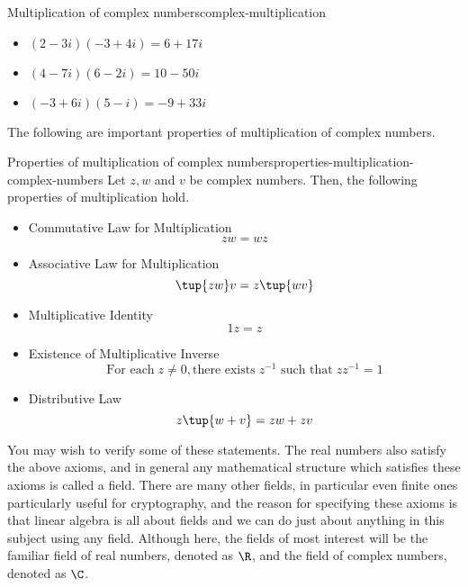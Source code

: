 \begin{example}{Multiplication of complex numbers}{complex-multiplication}
\begin{itemize}
\item $(2-3i)(-3+4i) = 6+17i$
\item $(4-7i)(6-2i) = 10-50i$
\item $(-3+6i)(5-i) = -9+33i$
\end{itemize}
\end{example}

The following are important properties of multiplication of complex numbers.

\begin{theorem}{Properties of multiplication of complex numbers}{properties-multiplication-complex-numbers}
Let $z,w$ and $v$ be complex numbers. Then, the following properties of multiplication hold.

\begin{itemize}

\item Commutative Law for Multiplication
\begin{equation*}
zw=wz
\end{equation*}

\item Associative Law for Multiplication
\begin{equation*}
\tup{zw} v=z\tup{wv} 
\end{equation*}

\item Multiplicative Identity
\begin{equation*}
1z=z
\end{equation*}

\item Existence of Multiplicative Inverse
\begin{equation*}
\mbox{For each}\; z\neq 0, \mbox{there exists}\; z^{-1} \mbox{ such that}\; zz^{-1}=1
\end{equation*}

\item Distributive Law
\begin{equation*}
z\tup{w+v} =zw+zv
\end{equation*}
\end{itemize}
\end{theorem}

You may wish to verify some of these statements.  The real numbers
also satisfy the above axioms, and in general any mathematical
structure which satisfies these axioms is called a field. There are
many other fields, in particular even finite ones particularly useful
for cryptography, and the reason for specifying these axioms is that
linear algebra is all about fields and we can do just about anything
in this subject using any field. Although here, the fields of most
interest will be the familiar field of real numbers, denoted as
$\R$, and the field of complex numbers, denoted as
$\C$.

